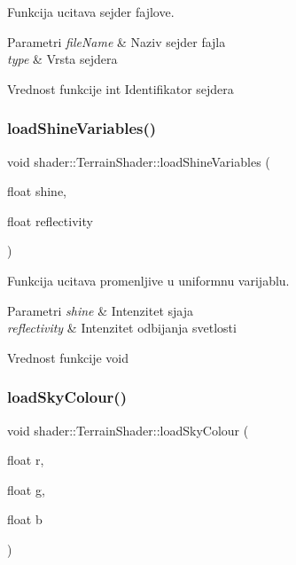 Funkcija ucitava sejder fajlove. 


\begin{DoxyParams}{Parametri}
{\em file\+Name} & Naziv sejder fajla \\
\hline
{\em type} & Vrsta sejdera \\
\hline
\end{DoxyParams}
\begin{DoxyReturn}{Vrednost funkcije}
int Identifikator sejdera 
\end{DoxyReturn}
\mbox{\label{classshader_1_1TerrainShader_a726a1237f6c1ebae3c3534b80260c553}} 
\subsubsection{\texorpdfstring{load\+Shine\+Variables()}{loadShineVariables()}}
{\footnotesize\ttfamily void shader\+::\+Terrain\+Shader\+::load\+Shine\+Variables (\begin{DoxyParamCaption}\item[{float}]{shine,  }\item[{float}]{reflectivity }\end{DoxyParamCaption})}



Funkcija ucitava promenljive u uniformnu varijablu. 


\begin{DoxyParams}{Parametri}
{\em shine} & Intenzitet sjaja \\
\hline
{\em reflectivity} & Intenzitet odbijanja svetlosti \\
\hline
\end{DoxyParams}
\begin{DoxyReturn}{Vrednost funkcije}
void 
\end{DoxyReturn}
\mbox{\label{classshader_1_1TerrainShader_af1a33992fb70f65ba37dba1e4027a74e}} 
\subsubsection{\texorpdfstring{load\+Sky\+Colour()}{loadSkyColour()}}
{\footnotesize\ttfamily void shader\+::\+Terrain\+Shader\+::load\+Sky\+Colour (\begin{DoxyParamCaption}\item[{float}]{r,  }\item[{float}]{g,  }\item[{float}]{b }\end{DoxyParamCaption})}




